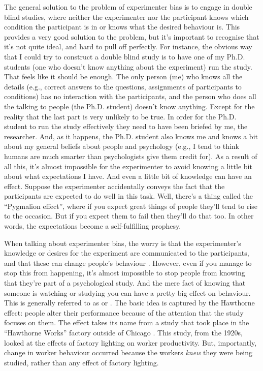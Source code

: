 The general solution to the problem of experimenter bias is to engage in double blind studies, where neither the experimenter nor the participant knows which condition the participant is in or knows what the desired behaviour is. This provides a very good solution to the problem, but it's important to recognise that it's not quite ideal, and hard to pull off perfectly. For instance, the obvious way that I could try to construct a double blind study is to have one of my Ph.D. students (one who doesn't know anything about the experiment) run the study. That feels like it should be enough. The only person (me) who knows all the details (e.g., correct answers to the questions, assignments of participants to conditions) has no interaction with the participants, and the person who does all the talking to people (the Ph.D. student) doesn't know anything. Except for the  reality that the last part is very unlikely to be true. In order for the Ph.D. student to run the study effectively they need to have been briefed by me, the researcher. And, as it happens, the Ph.D. student also knows me and knows a bit about my general beliefs about people and psychology (e.g., I tend to think humans are much smarter than psychologists give them credit for). As a result of all this, it's almost impossible for the experimenter to avoid knowing a little bit about what expectations I have. And even a little bit of knowledge can have an effect. Suppose the experimenter accidentally conveys the fact that the participants are expected to do well in this task. Well, there's a thing called the ``Pygmalion effect'', where if you expect great things of people they'll tend to rise to the occasion. But if you expect them to fail then they'll do that too. In other words, the expectations become a self-fulfilling prophesy.



When talking about experimenter bias, the worry is that the experimenter's knowledge or desires for the experiment are communicated to the participants, and that these can change people's behaviour \parencite{Rosenthal1966}. However, even if you manage to stop this from happening, it's almost impossible to stop people from knowing that they're part of a psychological study. And the mere fact of knowing that someone is watching or studying you can have a pretty big effect on behaviour. This is generally referred to as  or . The basic idea is captured by the Hawthorne effect: people alter their performance because of the attention that the study focuses on them. The effect takes its name from a study that took place in the ``Hawthorne Works'' factory outside of Chicago \parencite[see][]{Adair1984}. This study, from the 1920s, looked at the effects of factory lighting on worker productivity. But, importantly, change in worker behaviour occurred because the workers {\it knew} they were being studied, rather than any effect of factory lighting.

